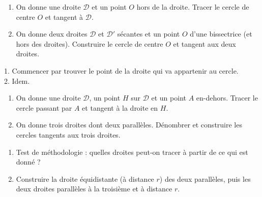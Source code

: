 \begin{exo}
\begin{enumerate}
\item On donne une droite $\mathcal D$ et un point $O$ hors de la droite. Tracer le cercle de centre $O$ et tangent à $\mathcal D$.

\item On donne deux droites $\mathcal D$ et $\mathcal D'$ sécantes et un point $O$ d'une bissectrice (et hors des droites). Construire le cercle de centre $O$ et tangent aux deux droites. 
\end{enumerate}


\begin{hint}   
1. Commencer par trouver le point de la droite qui va appartenir au cercle.\\

2. Idem.
\end{hint}  
    
\end{exo}  

\begin{exo}
\begin{enumerate}
\item On donne une droite $\mathcal D$, un point $H$ sur $\mathcal D$ et un point $A$ en-dehors. Tracer le cercle passant par $A$ et tangent à la droite en $H$.%



\item On donne trois droites dont deux parallèles. Dénombrer et construire les cercles tangents aux trois droites. 


\end{enumerate}



\begin{hint}   
\begin{enumerate}
\item Test de méthodologie : quelles droites peut-on tracer à partir de ce qui est donné ?
\item Construire la droite équidistante (à distance $r$) des deux parallèles, puis les deux droites parallèles à la troisième et à distance $r$.
\end{enumerate}
\end{hint}      

\end{exo}  




